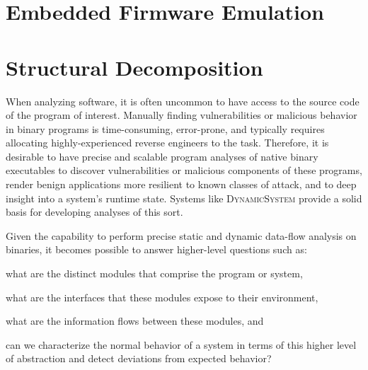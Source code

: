 \documentclass[letterpaper,twoside,11pt,headings=small]{scrartcl}
\newcommand{\dynamicsys}{\textsc{DynamicSystem}\xspace}
\begin{document}
\section{Embedded Firmware Emulation}
\label{sec:research:firmware}



\section{Structural Decomposition}
\label{sec:research:structure}

\cite{csallner:icse2008:dysy}
\cite{krka:icsa2010:inference}
\cite{chipounov:asplos2011:s2e}

When analyzing software, it is often uncommon to have access to the source
code of the program of interest.  Manually finding vulnerabilities or
malicious behavior in binary programs is time-consuming, error-prone, and
typically requires allocating highly-experienced reverse engineers to the
task. Therefore, it is desirable to have precise and scalable program analyses
of native binary executables to discover vulnerabilities or malicious
components of these programs, render benign applications more resilient to
known classes of attack, and to deep insight into a system's runtime state.
Systems like \dynamicsys provide a solid basis for developing analyses of this
sort.

Given the capability to perform precise static and dynamic data-flow analysis
on binaries, it becomes possible to answer higher-level questions such as:
\begin{inparaenum}[i)]
    \item what are the distinct modules that comprise the program or system,
    \item what are the interfaces that these modules expose to their environment,
    \item what are the information flows between these modules, and
    \item can we characterize the normal behavior of a system in terms of this higher
        level of abstraction and detect deviations from expected behavior?
\end{inparaenum}
\end{document}
